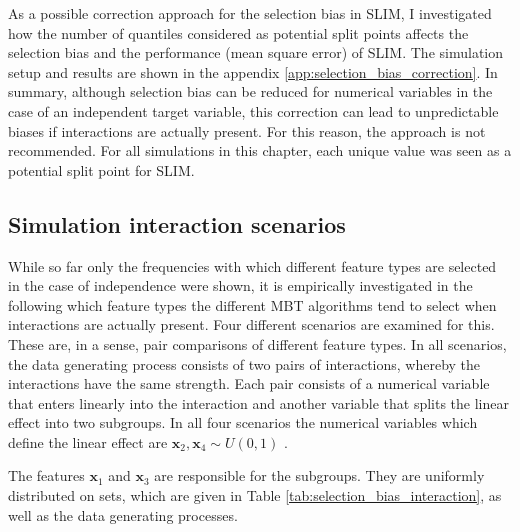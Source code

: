 As a possible correction approach for the selection bias in SLIM, I investigated how the number of quantiles considered as potential split points affects the selection bias and the performance (mean square error) of SLIM. The simulation setup and results are shown in the appendix \ref{app:selection_bias_correction}. In summary, although selection bias can be reduced for numerical variables in the case of an independent target variable, this correction can lead to unpredictable biases if interactions are actually present. For this reason, the approach is not recommended. 
For all simulations in this chapter, each unique value was seen as a potential split point for SLIM.






\subsection{Simulation interaction scenarios} \label{selection_bias_interactions}
While so far only the frequencies with which different feature types are selected in the case of independence were shown, it is empirically investigated in the following which feature types the different MBT algorithms tend to select when interactions are actually present.
Four different scenarios are examined for this. These are, in a sense, pair comparisons of different feature types. In all scenarios, the data generating process consists of two pairs of interactions, whereby the interactions have the same strength. Each pair consists of a numerical variable that enters linearly into the interaction and another variable that splits the linear effect into two subgroups.
In all four scenarios the numerical variables which define the linear effect are 
 $\textbf{x}_{2}, \textbf{x}_{4} \sim U(0,1)$ .

The features $\textbf{x}_{1}$ and $\textbf{x}_{3}$ are responsible for the subgroups. They are uniformly distributed on sets, which are given in Table \ref{tab:selection_bias_interaction}, as well as the data generating processes.

